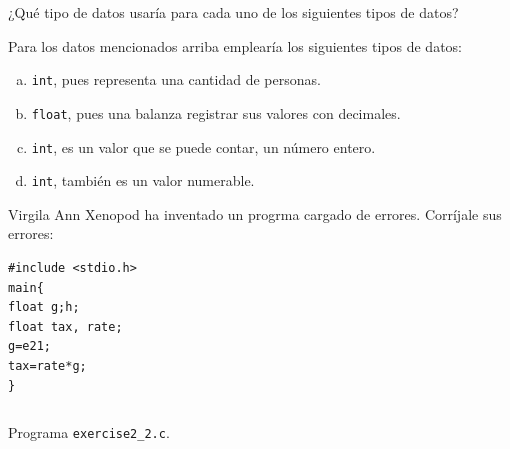 \documentclass[spanish,addpoints,answers,a4paper]{exam}
\begin{document}
\begin{questions}

\question ¿Qué tipo de datos usaría para cada uno de los siguientes tipos de datos?

\begin{solution}
Para los datos mencionados arriba emplearía los siguientes tipos de datos:
\begin{enumerate}[(a)]
	\item \texttt{int}, pues representa una cantidad de personas.
	\item \texttt{float}, pues una balanza registrar sus valores con decimales.
	\item \texttt{int}, es un valor que se puede contar, un número entero.
	\item \texttt{int}, también es un valor numerable.
\end{enumerate}
\end{solution}

\question Virgila Ann Xenopod ha inventado un progrma cargado de errores. Corríjale sus errores:

\begin{verbatim}
#include <stdio.h>
main{
float g;h;
float tax, rate;
g=e21;
tax=rate*g;
}
\end{verbatim}

\begin{solution}
\begin{listing}[H]
	\footnotesize
	\inputminted{c}{exercise2_2.c}
	\caption{Programa \texttt{exercise2\_2.c}.}
	\label{lst:2.2}
\end{listing}
\end{solution}


\end{questions}
\end{document}
